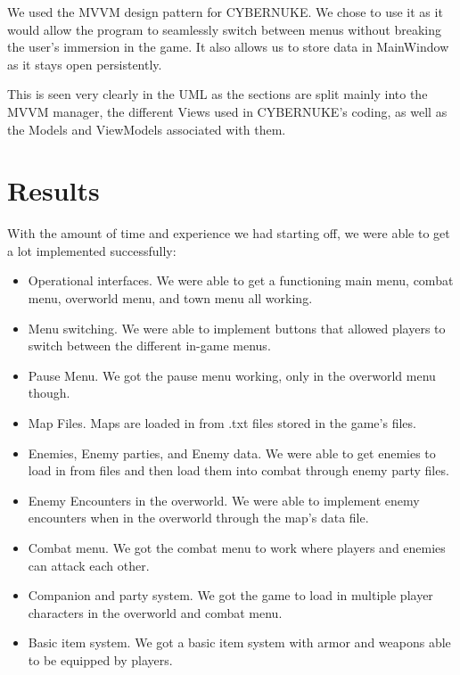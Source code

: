 \documentclass[10pt,conference,onecolumn,compsoc]{IEEEtran}
\begin{document}
We used the MVVM design pattern for CYBERNUKE. We chose to use it as it would allow the program to seamlessly switch between menus without breaking the user's immersion in the game. It also allows us to store data in MainWindow as it stays open persistently.

This is seen very clearly in the UML as the sections are split mainly into the MVVM manager, the different Views used in CYBERNUKE's coding, as well as the Models and ViewModels associated with them.


\section{Results}
With the amount of time and experience we had starting off, we were able to get a lot implemented successfully:
\begin{itemize}
	\item Operational interfaces. We were able to get a functioning main menu, combat menu, overworld menu, and town menu all working.
	\item Menu switching. We were able to implement buttons that allowed players to switch between the different in-game menus.
	\item Pause Menu. We got the pause menu working, only in the overworld menu though.
	\item Map Files. Maps are loaded in from .txt files stored in the game's files.
	\item Enemies, Enemy parties, and Enemy data. We were able to get enemies to load in from files and then load them into combat through enemy party files.
	\item Enemy Encounters in the overworld. We were able to implement enemy encounters when in the overworld through the map's data file.
	\item Combat menu. We got the combat menu to work where players and enemies can attack each other.
	\item Companion and party system. We got the game to load in multiple player characters in the overworld and combat menu.
	\item Basic item system. We got a basic item system with armor and weapons able to be equipped by players.
\end{itemize}
\end{document}
